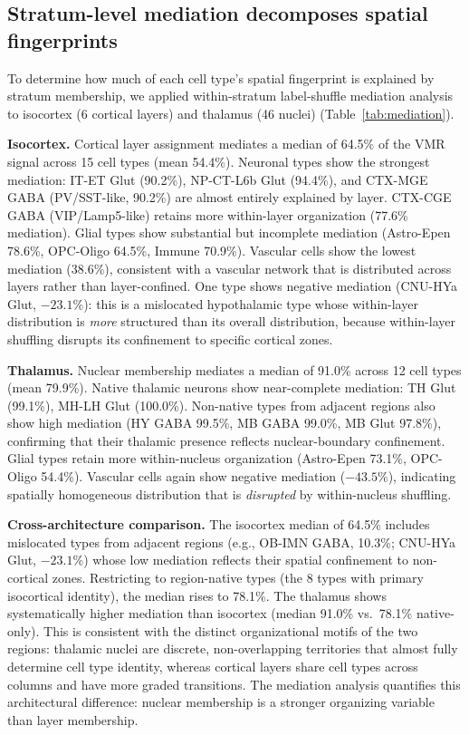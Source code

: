 \documentclass[11pt,a4paper]{article}
\begin{document}
\subsection{Stratum-level mediation decomposes spatial fingerprints}
\label{sec:result4}

To determine how much of each cell type's spatial fingerprint is explained by
stratum membership, we applied within-stratum label-shuffle mediation analysis
to isocortex (6 cortical layers) and thalamus (46 nuclei)
(Table~\ref{tab:mediation}).

\textbf{Isocortex.} Cortical layer assignment mediates a median of 64.5\% of
the VMR signal across 15 cell types (mean 54.4\%). Neuronal types show the
strongest mediation: IT-ET Glut (90.2\%), NP-CT-L6b Glut (94.4\%), and CTX-MGE
GABA (PV/SST-like, 90.2\%) are almost entirely explained by layer.
CTX-CGE GABA (VIP/Lamp5-like) retains more within-layer organization (77.6\%
mediation). Glial types show substantial but incomplete mediation
(Astro-Epen 78.6\%, OPC-Oligo 64.5\%, Immune 70.9\%). Vascular cells show the
lowest mediation (38.6\%), consistent with a vascular network that is distributed
across layers rather than layer-confined. One type shows negative mediation
(CNU-HYa Glut, $-23.1$\%): this is a mislocated hypothalamic type whose
within-layer distribution is \textit{more} structured than its overall
distribution, because within-layer shuffling disrupts its confinement to specific
cortical zones.

\textbf{Thalamus.} Nuclear membership mediates a median of 91.0\% across 12 cell
types (mean 79.9\%). Native thalamic neurons show near-complete mediation: TH Glut
(99.1\%), MH-LH Glut (100.0\%). Non-native types from adjacent regions also show
high mediation (HY GABA 99.5\%, MB GABA 99.0\%, MB Glut 97.8\%), confirming that
their thalamic presence reflects nuclear-boundary confinement. Glial types retain
more within-nucleus organization (Astro-Epen 73.1\%, OPC-Oligo 54.4\%). Vascular
cells again show negative mediation ($-43.5$\%), indicating spatially homogeneous
distribution that is \textit{disrupted} by within-nucleus shuffling.

\textbf{Cross-architecture comparison.} The isocortex median of 64.5\% includes
mislocated types from adjacent regions (e.g., OB-IMN GABA, 10.3\%; CNU-HYa Glut,
$-23.1$\%) whose low mediation reflects their spatial confinement to non-cortical
zones. Restricting to region-native types (the 8 types with primary isocortical
identity), the median rises to 78.1\%. The thalamus shows systematically higher
mediation than isocortex (median 91.0\% vs.\ 78.1\% native-only). This is consistent with
the distinct organizational motifs of the two regions: thalamic nuclei are
discrete, non-overlapping territories that almost fully determine cell type
identity, whereas cortical layers share cell types across columns and have
more graded transitions. The mediation analysis quantifies this architectural
difference: nuclear membership is a stronger organizing variable than layer
membership.
\end{document}
